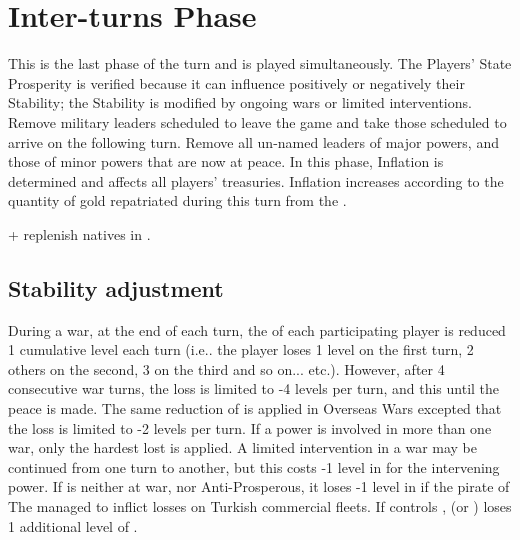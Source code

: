 \chapter{Inter-turns Phase}\label{chapter:Inter}

\InterPhase


This is the last phase of the turn and is played simultaneously.  The Players'
State Prosperity is verified because it can influence positively or negatively
their Stability; the Stability is modified by ongoing wars or limited
interventions.  Remove military leaders scheduled to leave the game and take
those scheduled to arrive on the following turn.  Remove all un-named leaders
of major powers, and those of minor powers that are now at peace.  In this
phase, Inflation is determined and affects all players' treasuries. Inflation
increases according to the quantity of gold repatriated during this turn from
the \ROTW.

\begin{todo}
  + replenish natives in \ROTW.
\end{todo}

\aparag[Sequence.]
\InterDetails



\section{Stability adjustment}

During a war, at the end of each turn, the \STAB of each participating player
is reduced 1 cumulative level each turn (i.e.. the player loses 1 level on the
first turn, 2 others on the second, 3 on the third and so
on... etc.). However, after 4 consecutive war turns, the loss is limited to -4
levels per turn, and this until the peace is made.
The same reduction of \STAB is applied in Overseas Wars excepted that the loss
is limited to -2 levels per turn.
 If a power is involved in more than one war, only the
hardest lost is applied.
A limited intervention in a war may be continued from one turn to another, but
this costs -1 level in \STAB for the intervening power.
If \TUR is neither at war, nor Anti-Prosperous, it loses -1 level in \STAB if
the pirate of The  managed to inflict losses on Turkish
commercial fleets.
\aparag[Vienna]
If \TUR controls , \HAB (\SPA or \AUS) loses 1 additional level
of \STAB.

